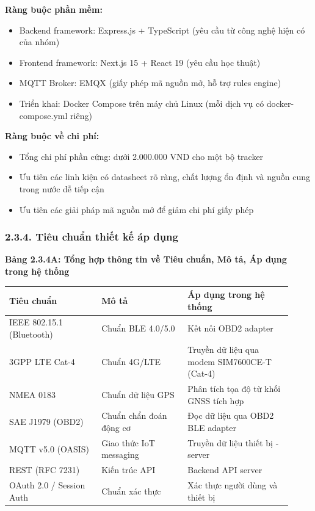 \documentclass[13pt,a4paper]{extarticle}
\newcounter{none} %
\newcommand{\thesislongtableorignewline}{}
\let\thesislongtableorignewline\\
\renewcommand{\\}{\thesislongtableorignewline\hline}%
\let\\\thesislongtableorignewline
\newcommand{\thesistabletitle}[1]{%
  \begin{center}\textbf{#1}\end{center}%
}
\providecommand{\tightlist}{%
  \setlength{\itemsep}{0pt}\setlength{\parskip}{0pt}}
\begin{document}
\textbf{Ràng buộc phần mềm:}

\begin{itemize}
\tightlist
\item
  Backend framework: Express.js + TypeScript (yêu cầu từ công nghệ hiện
  có của nhóm)
\item
  Frontend framework: Next.js 15 + React 19 (yêu cầu học thuật)
\item
  MQTT Broker: EMQX (giấy phép mã nguồn mở, hỗ trợ rules engine)
\item
  Triển khai: Docker Compose trên máy chủ Linux (mỗi dịch vụ có
  docker-compose.yml riêng)
\end{itemize}

\textbf{Ràng buộc về chi phí:}

\begin{itemize}
\tightlist
\item
  Tổng chi phí phần cứng: dưới 2.000.000 VND cho một bộ tracker
\item
  Ưu tiên các linh kiện có datasheet rõ ràng, chất lượng ổn định và
  nguồn cung trong nước dễ tiếp cận
\item
  Ưu tiên các giải pháp mã nguồn mở để giảm chi phí giấy phép
\end{itemize}

\subsubsection{2.3.4. Tiêu chuẩn thiết kế áp
dụng}\label{234-tiuxeau-chuux1ea9n-thiux1ebft-kux1ebf-uxe1p-dux1ee5ng}

{\def\LTcaptype{none} %
\thesistabletitle{Bảng 2.3.4A: Tổng hợp thông tin về Tiêu chuẩn, Mô tả, Áp dụng trong hệ thống}

\begin{longtable}{|p{0.30\linewidth}|p{0.28\linewidth}|p{0.34\linewidth}|}
\hline \textbf{Tiêu chuẩn} & \textbf{Mô tả} & \textbf{Áp dụng trong hệ thống} \\
\hline
\endhead
\hline
\endlastfoot
IEEE 802.15.1 (Bluetooth) & Chuẩn BLE 4.0/5.0 & Kết nối OBD2 adapter \\
3GPP LTE Cat-4 & Chuẩn 4G/LTE & Truyền dữ liệu qua modem SIM7600CE-T
(Cat-4) \\
NMEA 0183 & Chuẩn dữ liệu GPS & Phân tích tọa độ từ khối GNSS tích hợp \\
SAE J1979 (OBD2) & Chuẩn chẩn đoán động cơ & Đọc dữ liệu qua OBD2 BLE
adapter \\
MQTT v5.0 (OASIS) & Giao thức IoT messaging & Truyền dữ liệu thiết bị -
server \\
REST (RFC 7231) & Kiến trúc API & Backend API server \\
OAuth 2.0 / Session Auth & Chuẩn xác thực & Xác thực người dùng và thiết
bị \\
\end{longtable}
}
\end{document}

